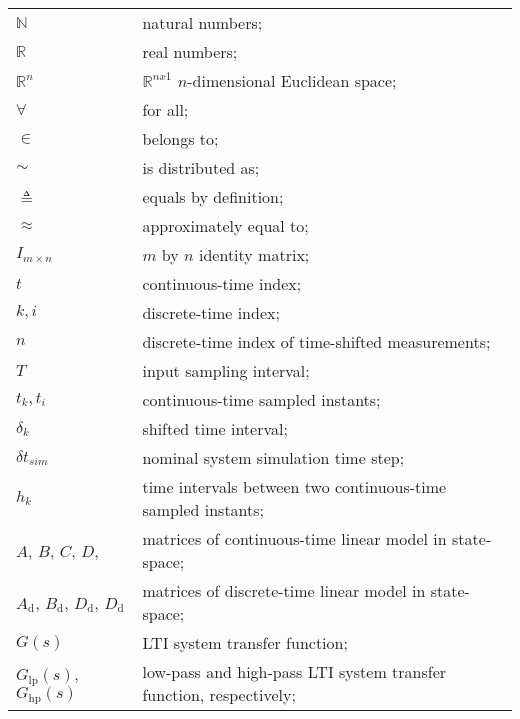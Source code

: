 \begin{longtable}{ll}
	
	$\mathbb{N}$			& natural numbers; \\
	$\mathbb{R}$ 			& real numbers; \\
	$\mathbb{R}^n$			& $\mathbb{R}^{nx1}$ $n$-dimensional Euclidean space; \\
	
	$\forall$				& for all; \\
	$\in$					& belongs to; \\
	$\sim$					& is distributed as; \\
	$\triangleq$			& equals by definition; \\	
	$\approx$				& approximately equal to; \\
	$I_{m\times n}$			& $m$ by $n$ identity matrix; \\
	$t$						& continuous-time index; \\
	$k, i$					& discrete-time index;  \\
	$n$						& discrete-time index of time-shifted measurements;  \\
	$T$						& input sampling interval; \\
	$t_k, t_i$				& continuous-time sampled instants; \\
	$\delta_k$				& shifted time interval; \\
	$\delta t_{sim}$		& nominal system simulation time step; \\
	$h_k$					& time intervals between two continuous-time sampled instants; \\
	$A$, $B$, $C$, $D$,		& matrices of continuous-time linear model in state-space;  \\
	$A_{\textrm{d}}$,
	$B_{\textrm{d}}$,
	$D_{\textrm{d}}$,
	$D_{\textrm{d}}$		& matrices of discrete-time linear model in state-space;  \\
	
	$G(s)$					& LTI system transfer function; \\
	$G_{\textrm{lp}}(s)$,
	$G_{\textrm{hp}}(s)$	& low-pass and high-pass LTI system transfer function, respectively; \\


\end{longtable}
